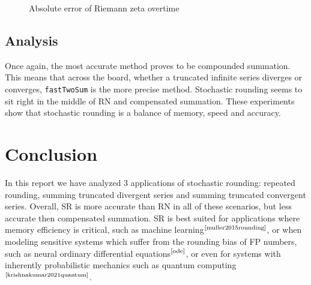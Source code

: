 \documentclass[a4paper]{article} %
\begin{document}
\begin{multicols}{2}
\begin{figure}[H]
    \centering
    
    \caption{Absolute error of Riemann zeta overtime}
    \label{fig:p4}
\end{figure}

\subsection{Analysis}
Once again, the most accurate method proves to be compounded summation. This means that across the board, whether a truncated infinite series diverges or converges, \verb|fastTwoSum| is the more precise method. Stochastic rounding seems to sit right in the middle of RN and compensated summation. These experiments show that stochastic rounding is a balance of memory, speed and accuracy.
\end{multicols}

\bigskip

\section{Conclusion}
In this report we have analyzed 3 applications of stochastic rounding: repeated rounding, summing truncated divergent series and summing truncated convergent series. Overall, SR is more accurate than RN in all of these scenarios, but less accurate then compensated summation. SR is best suited for applications where memory efficiency is critical, such as machine learning$^\text{\cite{muller2015rounding}}$, or when modeling sensitive systems which suffer from the rounding bias of FP numbers, such as neural ordinary differential equations$^\text{\cite{ode}}$, or even for systems with inherently probabilistic mechanics such as quantum computing$^\text{\cite{krishnakumar2021quantum}}$.


\printbibliography

\tableofcontents


\newpage
\end{document}
